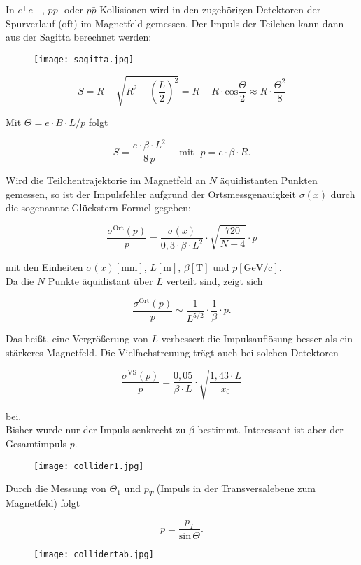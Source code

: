 In $e^+e^-$-, $pp$- oder $p\bar{p}$-Kollisionen wird in den zugehörigen Detektoren der Spurverlauf
(oft) im Magnetfeld gemessen. Der Impuls der Teilchen kann dann aus der Sagitta berechnet werden:

\begin{figure}[H]
	\centering
	\texttt{[image: sagitta.jpg]}
\end{figure}

\[S= R-\sqrt{R^2-\left(\frac{L}{2} \right)^2} = R-R\cdot\text{cos}\frac{\Theta}{2}\approx R\cdot
\frac{\Theta^2}{8} \]

Mit $\Theta = e\cdot B\cdot L/p$ folgt

\[S= \frac{e\cdot\beta\cdot L^2}{8\,p}~~~~~~\text{mit}~~~p=e\cdot\beta\cdot R. \]

Wird die Teilchentrajektorie im Magnetfeld an $N$ äquidistanten Punkten gemessen, so ist der
Impulsfehler aufgrund der Ortsmessgenauigkeit $\sigma(x)$ durch die sogenannte Glückstern-Formel
gegeben:

\[ \frac{\sigma^{\text{Ort}}(p)}{p} = \frac{\sigma(x)}{0{,}3\cdot\beta\cdot L^2}\cdot
\sqrt{\frac{720}{N+4}}\cdot p \]

mit den Einheiten $\sigma(x)\left[\text{mm} \right]$, $L\left[\text{m} \right]$,
$\beta\left[\text{T} \right]$ und $p\left[\text{GeV/c} \right]$.
\\
Da die $N$ Punkte äquidistant über $L$ verteilt sind, zeigt sich

\[ \frac{\sigma^{\text{Ort}}(p)}{p} \sim \frac{1}{L^{5/2}}\cdot \frac{1}{\beta}\cdot p .\]

Das heißt, eine Vergrößerung von $L$ verbessert die Impulsauflösung besser als ein stärkeres
Magnetfeld. Die Vielfachstreuung trägt auch bei solchen Detektoren

\[\frac{\sigma^{\text{VS}}(p)}{p} = \frac{0{,}05}{\beta \cdot L}\cdot \sqrt{\frac{1{,}43\cdot
L}{x_0}} \]

bei. 
\\
Bisher wurde nur der Impuls senkrecht zu $\beta$ bestimmt. Interessant ist aber der Gesamtimpuls
$p$. 

\begin{figure}[H]
	\centering
	\texttt{[image: collider1.jpg]}
\end{figure}

Durch die Messung von $\Theta_1$ und $p_T$ (Impuls in der Transversalebene zum Mag\-netfeld) folgt

\[p=\frac{p_T}{\text{sin}\,\Theta} .\]

\begin{figure}[H]
	\centering
	\texttt{[image: collidertab.jpg]}
\end{figure}